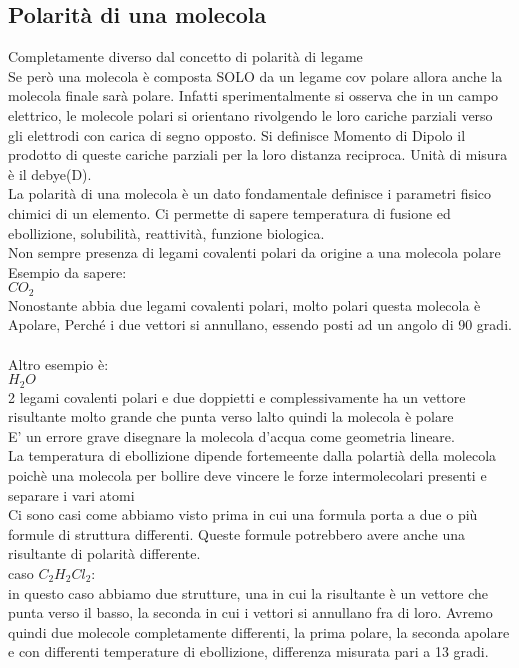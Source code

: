\subsection{Polarità di una molecola}
Completamente diverso dal concetto di polarità di legame\\
Se però una molecola è composta SOLO da un legame cov polare allora anche la molecola finale sarà polare. Infatti sperimentalmente si osserva che in un campo elettrico, le molecole polari si orientano rivolgendo le loro cariche parziali verso gli elettrodi con carica di segno opposto. Si definisce Momento di Dipolo il prodotto di queste cariche parziali per la loro distanza reciproca. Unità di misura è il debye(D).\\
La polarità di una molecola è un dato fondamentale definisce i parametri fisico chimici di un elemento. Ci permette di sapere temperatura di fusione ed ebollizione, solubilità, reattività, funzione biologica. \\
Non sempre presenza di legami covalenti polari da origine a una molecola polare\\
Esempio da sapere:\\
$CO_2$\\
Nonostante abbia due legami covalenti polari, molto polari questa molecola è Apolare, Perché i due vettori si annullano, essendo posti ad un angolo di 90 gradi.\\\\
Altro esempio è:\\
$H_2O$ \\
2 legami covalenti polari e due doppietti e complessivamente ha un vettore risultante molto grande che punta verso lalto quindi la molecola è polare\\
E’ un errore grave disegnare la molecola d’acqua come geometria lineare. \\
La temperatura di ebollizione dipende fortemeente dalla polartià della molecola poichè una molecola per bollire deve vincere le forze intermolecolari presenti e separare i vari atomi\\
Ci sono casi come abbiamo visto prima in cui una formula porta a due o più formule di struttura differenti. Queste formule potrebbero avere anche una risultante di polarità differente.\\ 
caso $C_2H_2Cl_2$:\\
in questo caso abbiamo due strutture, una in cui la risultante è un vettore che punta verso il basso, la seconda in cui i vettori si annullano fra di loro. Avremo quindi due molecole completamente differenti, la prima polare, la seconda apolare e con differenti temperature di ebollizione, differenza misurata pari a 13 gradi. 